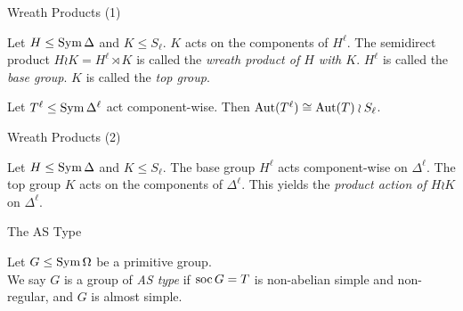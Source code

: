 \begin{frame}{Wreath Products (1)}
    \begin{defn}
        Let $H \leq \operatorname{Sym} \Delta$ and $K \leq S_\ell$.
        $K$ acts on the components of $H ^ \ell$.
        \pause
        The semidirect product
        $H \wr K = H ^ \ell \rtimes K$
        is called the \emph{wreath product of $H$ with $K$}.
        \pause
        $H ^ \ell$ is called the \emph{base group}.
        \pause
        $K$ is called the \emph{top group}.
    \end{defn}
    \vspace{1em}
    \pause
    \begin{thm}
        Let $T ^ \ell \leq \operatorname{Sym} \Delta ^ \ell$ act component-wise.
        Then $\operatorname{Aut}( T ^ \ell ) \cong \operatorname{Aut}(T) \wr S_\ell$.
    \end{thm}
\end{frame}


\begin{frame}{Wreath Products (2)}
    \begin{defn}
        Let $H \leq \operatorname{Sym} \Delta$ and $K \leq S_\ell$.
        The base group $H ^ \ell$ acts component-wise on $\Delta ^ \ell$.
        The top group $K$ acts on the components of $\Delta ^ \ell$.
        \pause
        This yields the \emph{product action of $H \wr K$} on $\Delta ^ \ell$.
    \end{defn}
\end{frame}


\begin{frame}{The AS Type}
    \begin{defn}
        Let $G \leq \operatorname{Sym} \Omega$ be a primitive group.
        \\
        We say $G$ is a group of \emph{AS type} if
        $\operatorname{soc} G = T$ is non-abelian simple and non-regular,
        and $G$ is almost simple.
    \end{defn}
\end{frame}



